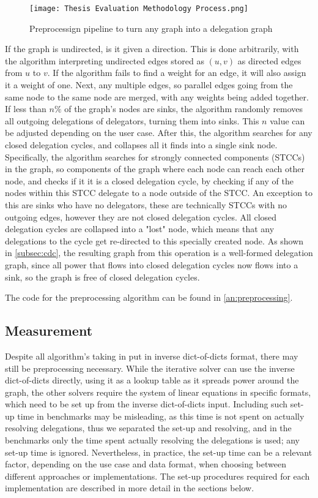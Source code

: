 \begin{figure}[t]
    \centering
    \texttt{[image: Thesis Evaluation Methodology Process.png]}
    \caption{Preprocessign pipeline to turn any graph into a delegation graph}
    \label{fig:cleaning_process}
\end{figure}

If the graph is undirected, is it given a direction. This is done arbitrarily, with the algorithm interpreting undirected edges stored as $(u, v)$ as directed edges from $u$ to $v$. If the algorithm fails to find a weight for an edge, it will also assign it a weight of one. Next, any multiple edges, so parallel edges going from the same node to the same node are merged, with any weights being added together. If less than $n\%$ of the graph's nodes are sinks, the algorithm randomly removes all outgoing delegations of delegators, turning them into sinks. This $n$ value can be adjusted depending on the user case. After this, the algorithm searches for any closed delegation cycles, and collapses all it finds into a single sink node. Specifically, the algorithm searches  for strongly connected components (STCCs) in the graph, so components of the graph where each node can reach each other node, and checks if it it is a closed delegation cycle, by checking if any of the nodes within this STCC delegate to a node outside of the STCC. An exception to this are sinks who have no delegators, these are technically STCCs with no outgoing edges, however they are not closed delegation cycles. All closed delegation cycles are collapsed into a "lost" node, which means that any delegations to the cycle get re-directed to this specially created node. As shown in \cref{subsec:cdc}, the resulting graph from this operation is a well-formed delegation graph, since all power that flows into closed delegation cycles now flows into a sink, so the graph is free of closed delegation cycles.

The code for the preprocessing algorithm can be found in \cref{an:preprocessing}. 

\subsection{Measurement}

Despite all algorithm's taking in put in inverse dict-of-dicts format, there may still be preprocessing necessary. While the iterative solver can use the inverse dict-of-dicts directly, using it as a lookup table as it spreads power around the graph, the other solvers require the system of linear equations in specific formats, which need to be set up from the inverse dict-of-dicts input. Including such set-up time in benchmarks may be misleading, as this time is not spent on actually resolving delegations, thus we separated the set-up and resolving, and in the benchmarks only the time spent actually resolving the delegations is used; any set-up time is ignored. Nevertheless, in practice, the set-up time can be a relevant factor, depending on the use case and data format, when choosing between different approaches or implementations. The set-up procedures required for each implementation are described in more detail in the sections below.

